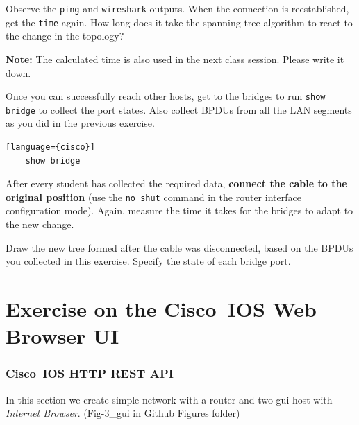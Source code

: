 \documentclass{UTNetLab}
\begin{document}
    Observe the \lstinline{ping} and \lstinline{wireshark} outputs. When the connection is reestablished, get the \lstinline{time} again. How long does it take the spanning tree algorithm to react to the change in the topology?
    
      \textbf{ Note:} The calculated time is also used in the next class session. Please write it down.
    
    Once you can successfully reach other hosts, get to the bridges to run \lstinline[language={cisco}]{show bridge} to collect the port states. Also collect BPDUs from all the LAN segments as you did in the previous exercise.
    
    \begin{lstlisting}[frame=trBL][language={cisco}]
    show bridge
    \end{lstlisting}
    
   After every student has collected the required data, \textbf{connect the cable to the original position} (use the \lstinline{no shut} command in the router interface configuration mode). Again, measure the time it takes for the bridges to adapt to the new change.
   
    \begin{report}
    \item Draw the new tree formed after the cable was disconnected, based on the BPDUs you collected in this exercise. Specify the state of each bridge port.

    \end{report}

\part{Exercise on the Cisco~IOS Web Browser UI}
\section{Cisco~IOS HTTP REST API}
    In this section we create simple network with a router and two gui host with \textit{Internet Browser}. (Fig-3\_gui in Github Figures folder)
\end{document}

